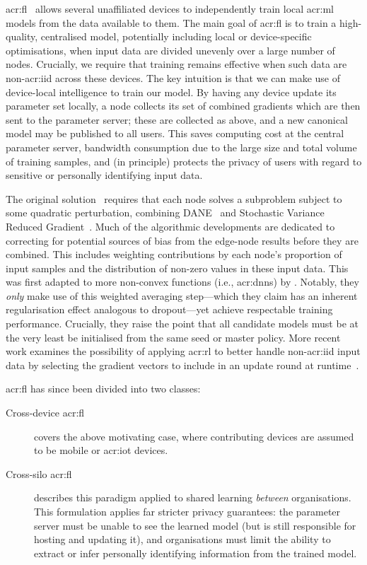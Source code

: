 \acrfull{acr:fl}~\parencite{DBLP:journals/corr/KonecnyMRR16,DBLP:journals/corr/Konecny17,DBLP:conf/mlsys/BonawitzEGHIIKK19} allows several unaffiliated devices to independently train local \gls{acr:ml} models from the data available to them.
The main goal of \gls{acr:fl} is to train a high-quality, centralised model, potentially including local or device-specific optimisations, when input data are divided unevenly over a large number of nodes.
Crucially, we require that training remains effective when such data are non-\gls{acr:iid} across these devices.
The key intuition is that we can make use of device-local intelligence to train our model.
By having any device update its parameter set locally, a node collects its set of combined gradients which are then sent to the parameter server; these are collected as above, and a new canonical model may be published to all users.
This saves computing cost at the central parameter server, bandwidth consumption due to the large size and total volume of training samples, and (in principle) protects the privacy of users with regard to sensitive or personally identifying input data.

The original solution~\parencite{DBLP:journals/corr/KonecnyMRR16} requires that each node solves a subproblem subject to some quadratic perturbation, combining DANE~\parencite{DBLP:conf/icml/ShamirS014} and Stochastic Variance Reduced Gradient~\parencite{DBLP:conf/nips/Johnson013}.
Much of the algorithmic developments are dedicated to correcting for potential sources of bias from the edge-node results before they are combined.
This includes weighting contributions by each node's proportion of input samples and the distribution of non-zero values in these input data.
This was first adapted to more non-convex functions (i.e., \glspl{acr:dnn}) by \textcite{DBLP:conf/aistats/McMahanMRHA17}.
Notably, they \emph{only} make use of this weighted averaging step---which they claim has an inherent regularisation effect analogous to dropout---yet achieve respectable training performance.
Crucially, they raise the point that all candidate models must be at the very least be initialised from the same seed or master policy.
More recent work examines the possibility of applying \gls{acr:rl} to better handle non-\gls{acr:iid} input data by selecting the gradient vectors to include in an update round at runtime~\parencite{DBLP:conf/infocom/WangKNL20}.

\gls{acr:fl} has since been divided into two classes:
\begin{description}
	\item[Cross-device \gls{acr:fl}] covers the above motivating case, where contributing devices are assumed to be mobile or \gls{acr:iot} devices.
	\item[Cross-silo \gls{acr:fl}] describes this paradigm applied to shared learning \emph{between} organisations. This formulation applies far stricter privacy guarantees: the parameter server must be unable to see the learned model (but is still responsible for hosting and updating it), and organisations must limit the ability to extract or infer personally identifying information from the trained model.
\end{description}

